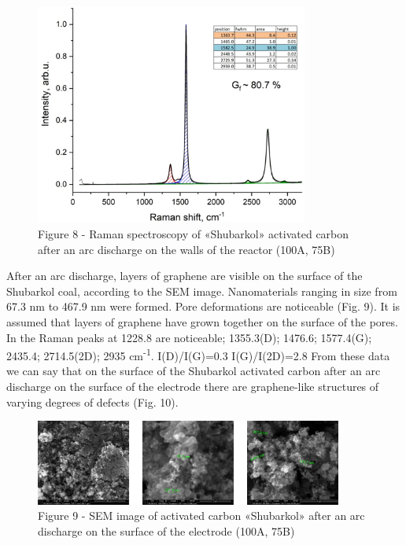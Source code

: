 \begin{figure}[H]
	\centering
	\includegraphics[width=0.8\textwidth]{assets/60}
	\caption*{Figure 8 - Raman spectroscopy of «Shubarkol» activated carbon after an arc discharge on the walls of the reactor (100A, 75B)}
\end{figure}

\begin{multicols}{2}
After an arc discharge, layers of graphene are visible on the surface of
the Shubarkol coal, according to the SEM image. Nanomaterials ranging in
size from 67.3 nm to 467.9 nm were formed. Pore
\hspace{0pt}\hspace{0pt}deformations are noticeable (Fig. 9). It is
assumed that layers of graphene have grown together on the surface of
the pores. In the Raman peaks at 1228.8 are noticeable; 1355.3(D);
1476.6; 1577.4(G); 2435.4; 2714.5(2D); 2935 cm\textsuperscript{-1}.
I(D)/I(G)=0.3 I(G)/I(2D)=2.8 From these data we can say that on the
surface of the Shubarkol activated carbon after an arc discharge on the
surface of the electrode there are graphene-like structures of varying
degrees of defects (Fig. 10).
\end{multicols}

\begin{figure}[H]
	\centering
	\includegraphics[width=0.9\textwidth]{assets/61}
	\caption*{Figure 9 - SEM image of activated carbon «Shubarkol» after an arc discharge on the surface of the electrode (100A, 75B)}
\end{figure}

